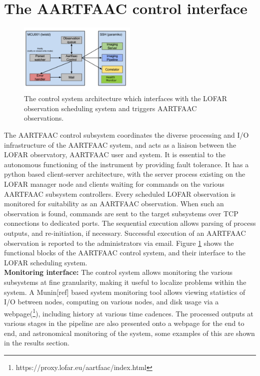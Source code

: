 \documentclass{ws-jai}
\begin{document}
\section {\label{sec:acontrol} The AARTFAAC control interface}
\begin{figure}[htbp]
\centering
\includegraphics[width=0.5\textwidth]{Figs/control_sys.png}
\caption{The  control  system  architecture  which  interfaces  with  the  LOFAR
  observation scheduling system and triggers AARTFAAC observations.}
\label{fig:afaac_ctrl_sys}
\end{figure}
The  AARTFAAC  control subsystem  coordinates  the  diverse processing  and  I/O
infrastructure of  the AARTFAAC system, and  acts as a liaison  between the LOFAR
observatory,  AARTFAAC user  and  system.   It is  essential  to the  autonomous
functioning of  the instrument by  providing fault  tolerance.  It has  a python
based client-server architecture, with the  server process existing on the LOFAR
manager node and clients waiting for  commands on the various AARTFAAC subsystem
controllers. Every scheduled  LOFAR observation is monitored  for suitability as
an AARTFAAC observation. When such an observation is found, commands are sent to
the target subsystems  over TCP connections to dedicated  ports.  The sequential
execution   allows   parsing   of   process  outputs,   and   re-initiation,   if
necessary. Successful  execution of an  AARTFAAC observation is reported  to the
administrators via email.  Figure  \ref{fig:afaac_ctrl_sys} shows the functional
blocks  of  the AARTFAAC  control  system,  and  their  interface to  the  LOFAR
scheduling system.\\  

\noindent \textbf  {Monitoring interface:} The control  system allows monitoring
the  various  subsystems at  fine  granularity,  making  it useful  to  localize
problems within  the system.  A Munin[ref] based  system monitoring  tool allows
viewing statistics  of I/O between nodes,  computing on various nodes,  and disk
usage   via  a   webpage(\footnote{https://proxy.lofar.eu/aartfaac/index.html}),
including history  at various time  cadences.  The processed outputs  at various
stages in the pipeline are also presented onto a webpage for the end to end, and
astronomical monitoring  of the system, some  examples of this are  shown in the
results section.
\end{document}
